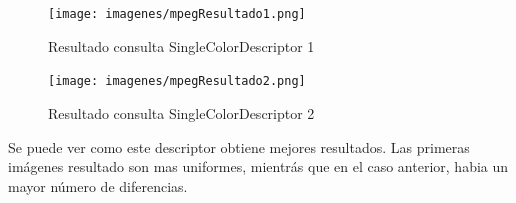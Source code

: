 \begin{figure}[H] %
\centering
\texttt{[image: imagenes/mpegResultado1.png]}  %
\label{mpegResultado1.png}
\caption{Resultado consulta SingleColorDescriptor 1 }
\end{figure}

\begin{figure}[H] %
\centering
\texttt{[image: imagenes/mpegResultado2.png]}  %
\label{mpegResultado1.png}
\caption{Resultado consulta SingleColorDescriptor 2 }
\end{figure}

Se puede ver como este descriptor obtiene mejores resultados. Las primeras imágenes resultado son mas uniformes, mientrás que en el caso anterior, habia un mayor número de diferencias.





